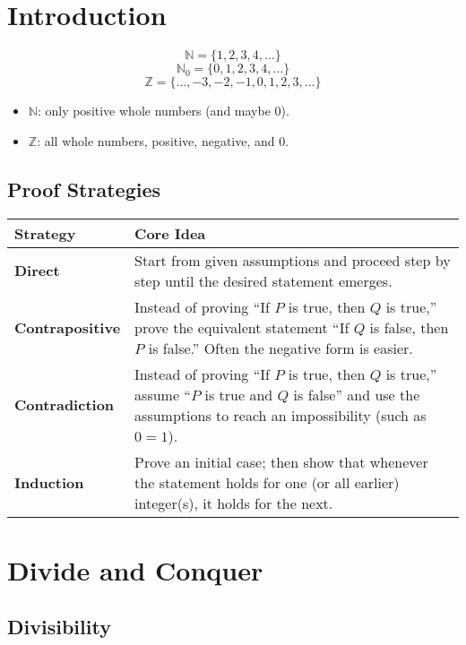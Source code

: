 \documentclass{article}
\theoremstyle{definition}
\begin{document}
\setcounter{section}{-1}


\section{Introduction}
\[
	\mathbb{N} = \{1,2,3,4,\dots\}
\]
\[
	\mathbb{N}_0 = \{0,1,2,3,4,\dots\}
\]
\[
	\mathbb{Z} = \{\dots,-3,-2,-1,0,1,2,3,\dots\}
\]

\begin{itemize}
	\item $\mathbb{N}$: only positive whole numbers (and maybe $0$).
	\item $\mathbb{Z}$: all whole numbers, positive, negative, and $0$.
\end{itemize}
\subsection{Proof Strategies}

\begin{tabular}{|>{\bfseries}m{3cm}|m{10cm}|}
	\hline
	Strategy       & Core Idea                                                                                                                                                             \\
	\hline
	Direct         & Start from given assumptions and proceed step by step until the desired statement emerges.                                                                            \\
	\hline
	Contrapositive & Instead of proving ``If $P$ is true, then $Q$ is true,'' prove the equivalent statement ``If $Q$ is false, then $P$ is false.'' Often the negative form is easier.    \\
	\hline
	Contradiction  & Instead of proving ``If $P$ is true, then $Q$ is true,'' assume ``$P$ is true and $Q$ is false'' and use the assumptions to reach an impossibility (such as $0 = 1$). \\
	\hline
	Induction      & Prove an initial case; then show that whenever the statement holds for one (or all earlier) integer(s), it holds for the next.                                        \\
	\hline
\end{tabular}


\section{Divide and Conquer}

\subsection{Divisibility}
\end{document}
